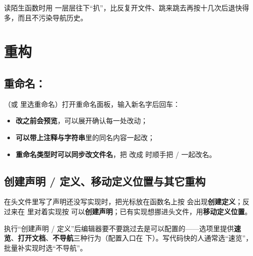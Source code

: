 \begin{keybox}[实战场景]
读陌生函数时用  一层层往下“扒”，比反复开文件、跳来跳去再按十几次后退快得多，而且不污染导航历史。
\end{keybox}

\section{重构}
\subsection{重命名：}

（或  里选重命名）打开重命名面板，输入新名字后回车：

\begin{itemize}
  \item \textbf{改之前会预览}，可以展开确认每一处改动；
  \item \textbf{可以带上注释与字符串}里的同名内容一起改；
  \item \textbf{重命名类型时可以同步改文件名}，把  改成  时顺手把  /  一起改名。
\end{itemize}

\subsection{创建声明 / 定义、移动定义位置与其它重构}

在头文件里写了声明还没写实现时，把光标放在函数名上按  会出现\textbf{创建定义}；反过来在  里对着实现按  可以\textbf{创建声明}；已有实现想挪进头文件，用\textbf{移动定义位置}。

\begin{tipbox}[提示]
执行“创建声明 / 定义”后编辑器要不要跳过去是可以配置的——选项里提供\textbf{速览}、\textbf{打开文档}、\textbf{不导航}三种行为（配置入口在  下）。写代码快的人通常选“速览”，批量补实现时选“不导航”。
\end{tipbox}

